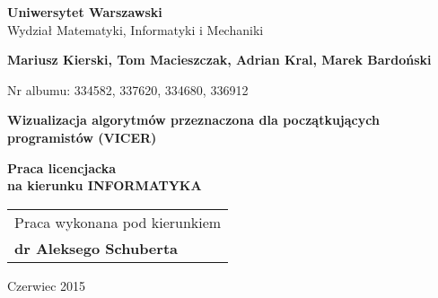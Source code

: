 \documentclass[a4paper,twoside,openright,11pt]{report}
\begin{document}
\begin{titlepage}%
    \let\footnotesize\small
    \let\footnoterule\relax
    \let \footnote \thanks
    \begin{center}%
      {\LARGE\textbf{Uniwersytet Warszawski}\\
        Wydzia\l{} Matematyki, Informatyki i Mechaniki\par}
      \vspace{1cm plus 1fill} 
      {\Large\bf Mariusz Kierski, Tom Macieszczak, Adrian Kral, Marek Bardoński\par}
      \vspace{0.2cm}
      {\large Nr albumu: 334582, 337620, 334680, 336912\par}
      \vspace{8mm plus .1fill}
      {\Huge\textbf{Wizualizacja algorytmów przeznaczona dla początkujących programistów (VICER)}\par}
      \vspace{8mm plus .1fill}
      {\large\bf Praca licencjacka\\[3pt]
        na kierunku \MakeUppercase{Informatyka} \\}
      \vspace{2cm plus 1.5fill}
      \begin{flushright}\large
        \begin{tabular}{l}
          Praca wykonana pod kierunkiem\\
          \bfseries dr Aleksego Schuberta
        \end{tabular}
      \end{flushright}
      \vspace{1cm plus 1fill}
      {\large Czerwiec 2015}
    \end{center}
  \end{titlepage}%
\end{document}
